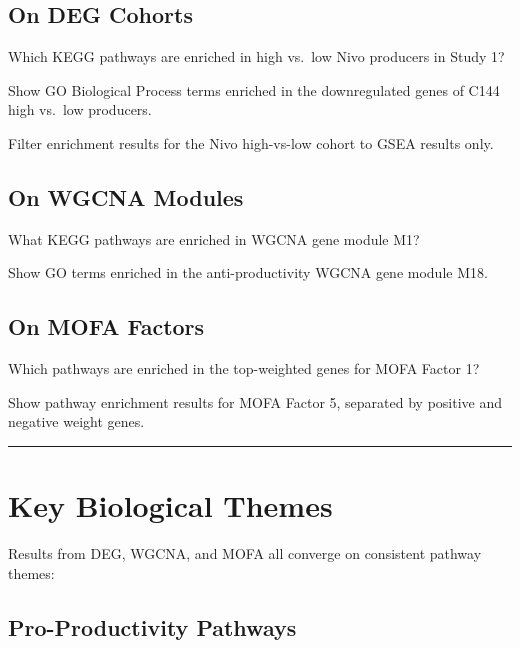 \documentclass[
  letterpaper,
  oneside,
  open=any]{scrbook}
\begin{document}
\subsection{On DEG Cohorts}\label{on-deg-cohorts}

Which KEGG pathways are enriched in high vs.~low Nivo producers in Study
1?

Show GO Biological Process terms enriched in the downregulated genes of
C144 high vs.~low producers.

Filter enrichment results for the Nivo high-vs-low cohort to GSEA
results only.

\subsection{On WGCNA Modules}\label{on-wgcna-modules}

What KEGG pathways are enriched in WGCNA gene module M1?

Show GO terms enriched in the anti-productivity WGCNA gene module M18.

\subsection{On MOFA Factors}\label{on-mofa-factors}

Which pathways are enriched in the top-weighted genes for MOFA Factor 1?

Show pathway enrichment results for MOFA Factor 5, separated by positive
and negative weight genes.

\begin{center}\rule{0.5\linewidth}{0.5pt}\end{center}

\section{Key Biological Themes}\label{key-biological-themes}

Results from DEG, WGCNA, and MOFA all converge on consistent pathway
themes:

\subsection{Pro-Productivity Pathways}\label{pro-productivity-pathways}
\end{document}

